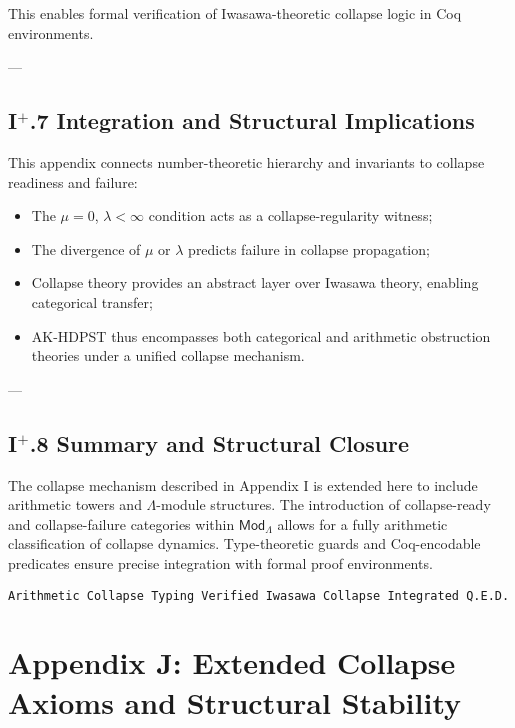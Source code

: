 \documentclass[11pt]{article}
\begin{document}
This enables formal verification of Iwasawa-theoretic collapse logic in Coq environments.

---

\subsection*{I$^{+}$.7 Integration and Structural Implications}

This appendix connects number-theoretic hierarchy and invariants to collapse readiness and failure:

\begin{itemize}
    \item The $\mu = 0$, $\lambda < \infty$ condition acts as a collapse-regularity witness;
    \item The divergence of $\mu$ or $\lambda$ predicts failure in collapse propagation;
    \item Collapse theory provides an abstract layer over Iwasawa theory, enabling categorical transfer;
    \item AK-HDPST thus encompasses both categorical and arithmetic obstruction theories under a unified collapse mechanism.
\end{itemize}

---

\subsection*{I$^{+}$.8 Summary and Structural Closure}

The collapse mechanism described in Appendix I is extended here to include arithmetic towers and $\Lambda$-module structures. The introduction of collapse-ready and collapse-failure categories within $\mathsf{Mod}_\Lambda$ allows for a fully arithmetic classification of collapse dynamics. Type-theoretic guards and Coq-encodable predicates ensure precise integration with formal proof environments.

\begin{flushright}
\texttt{Arithmetic Collapse Typing Verified \quad Iwasawa Collapse Integrated \quad Q.E.D.}
\end{flushright}



\section*{Appendix J: Extended Collapse Axioms and Structural Stability}
\end{document}
